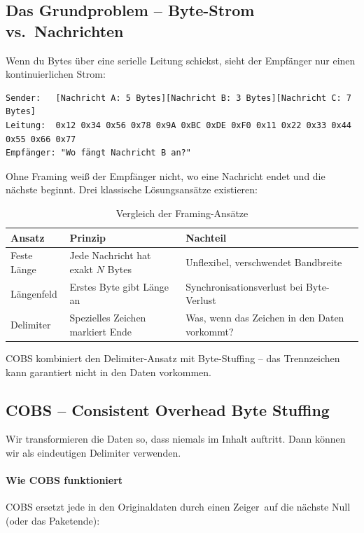 \subsection{Das Grundproblem -- Byte-Strom vs.\ Nachrichten}
\label{subsec:serial-grundproblem}

Wenn du Bytes über eine serielle Leitung schickst, sieht der Empfänger nur einen
kontinuierlichen Strom:

\begin{lstlisting}[style=base,numbers=none]
Sender:   [Nachricht A: 5 Bytes][Nachricht B: 3 Bytes][Nachricht C: 7 Bytes]
Leitung:  0x12 0x34 0x56 0x78 0x9A 0xBC 0xDE 0xF0 0x11 0x22 0x33 0x44 0x55 0x66 0x77
Empfänger: "Wo fängt Nachricht B an?"
\end{lstlisting}

Ohne Framing weiß der Empfänger nicht, wo eine Nachricht endet und die nächste beginnt.
Drei klassische Lösungsansätze existieren:

\begin{table}[H]
\centering
\caption{Vergleich der Framing-Ansätze}
\label{tab:framing-ansaetze}
\begin{tabular}{@{}lll@{}}
\toprule
\textbf{Ansatz} & \textbf{Prinzip} & \textbf{Nachteil} \\
\midrule
Feste Länge & Jede Nachricht hat exakt $N$ Bytes & Unflexibel, verschwendet Bandbreite \\
Längenfeld  & Erstes Byte gibt Länge an          & Synchronisationsverlust bei Byte-Verlust \\
Delimiter   & Spezielles Zeichen markiert Ende   & Was, wenn das Zeichen in den Daten vorkommt? \\
\bottomrule
\end{tabular}
\end{table}

COBS kombiniert den Delimiter-Ansatz mit Byte-Stuffing -- das Trennzeichen 
kann garantiert nicht in den Daten vorkommen.

\subsection{COBS -- Consistent Overhead Byte Stuffing}
\label{subsec:cobs}

Wir transformieren die Daten so, dass  niemals im Inhalt auftritt.
Dann können wir  als eindeutigen Delimiter verwenden.

\paragraph{Wie COBS funktioniert}
COBS ersetzt jede  in den Originaldaten durch einen \glqq Zeiger\grqq\ auf
die nächste Null (oder das Paketende):

